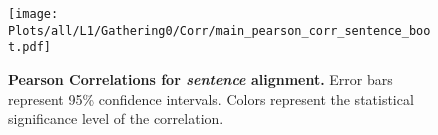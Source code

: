 \begin{figure*}[ht]
    \centering
    \texttt{[image: Plots/all/L1/Gathering0/Corr/main\_pearson\_corr\_sentence\_boot.pdf]}
    \caption{\textbf{Pearson Correlations for \textit{sentence} alignment.} Error bars represent 95\% confidence intervals. Colors represent the statistical significance level of the correlation.}
    \label{fig:main_pearson_corr_sentence_boot}
\end{figure*}